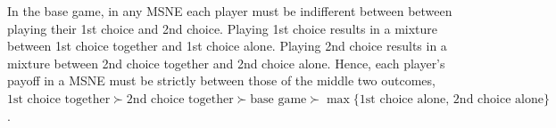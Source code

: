 \documentclass[letterpaper]{article}
\newcommand{\bparam}{b}
\newcommand{\cparam}{c}
\theoremstyle{definition}
\begin{document}
In the base game, in any MSNE each player must be indifferent between between playing their 1st choice and 2nd choice. Playing 1st choice results in a mixture between 1st choice together and 1st choice alone. Playing 2nd choice results in a mixture between 2nd choice together and 2nd choice alone. Hence, each player's payoff in a MSNE must be strictly between those of the middle two outcomes, $\text{1st choice together} \succ \text{2nd choice together} \succ \text{base game} \succ \max \{ \text{1st choice alone},\, \text{2nd choice alone} \}$.


\end{document}
